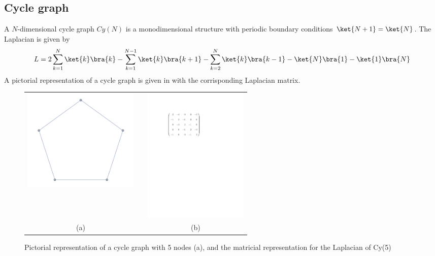     \subsection{Cycle graph}\label{subsec:cycle graph}
        A $N$-dimensional cycle graph $Cy(N)$ is a monodimensional structure with periodic boundary conditions $\ket{N+1}=\ket{N}$. The Laplacian is given by
        \begin{equation}
            L = 2\sum_{k=1}^{N}\ket{k}\bra{k} - \sum_{k=1}^{N-1}\ket{k}\bra{k+1} - \sum_{k=2}^{N}\ket{k}\bra{k-1}- \ket{N}\bra{1}-\ket{1}\bra{N}
        \end{equation}
        A pictorial representation of a cycle graph is given in  with the corrisponding Laplacian matrix.
        \begin{figure}[ht]
          \centering
          \begin{tabular}{ccc}
            \includegraphics[width=55mm]{./figures/chapter1/cycle} & \hspace{20pt} &\includegraphics[width=50mm]{./figures/chapter1/Laplacian} \\[0.5cm]
          (a)  & & (b) \\[6pt]
          \end{tabular}
          \caption[Pictorial representation of a cycle graph, and matricial representation for the Laplacian]{Pictorial representation of a cycle graph with 5 nodes (a), and the matricial representation for the Laplacian of Cy(5)}
          \label{fig:cyclegraph_pictorial_laplacian}
        \end{figure}
    \vspace{-0.7cm}
